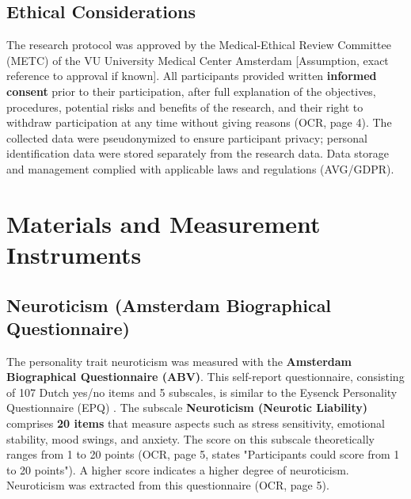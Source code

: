 \documentclass[11pt, a4paper]{report}
\begin{document}
\subsection{Ethical Considerations}
\label{subsec:ethics_method} %
The research protocol was approved by the Medical-Ethical Review Committee (METC) of the VU University Medical Center Amsterdam [Assumption, exact reference to approval if known]. All participants provided written \textbf{informed consent} prior to their participation, after full explanation of the objectives, procedures, potential risks and benefits of the research, and their right to withdraw participation at any time without giving reasons \cite{ThesisTempPDF} (OCR, page 4). The collected data were pseudonymized to ensure participant privacy; personal identification data were stored separately from the research data. Data storage and management complied with applicable laws and regulations (AVG/GDPR).

\section{Materials and Measurement Instruments}
\label{sec:materials_instruments} %

\subsection{Neuroticism (Amsterdam Biographical Questionnaire)}
\label{subsec:measurement_abv} %
The personality trait neuroticism was measured with the \textbf{Amsterdam Biographical Questionnaire (ABV)}. This self-report questionnaire, consisting of 107 Dutch yes/no items and 5 subscales, is similar to the Eysenck Personality Questionnaire (EPQ) \cite{EysenckEysenck1975}. The subscale \textbf{Neuroticism (Neurotic Liability)} comprises \textbf{20 items} that measure aspects such as stress sensitivity, emotional stability, mood swings, and anxiety. The score on this subscale theoretically ranges from 1 to 20 points \cite{ThesisTempPDF} (OCR, page 5, states "Participants could score from 1 to 20 points"). A higher score indicates a higher degree of neuroticism. Neuroticism was extracted from this questionnaire \cite{ThesisTempPDF} (OCR, page 5).
\end{document}
